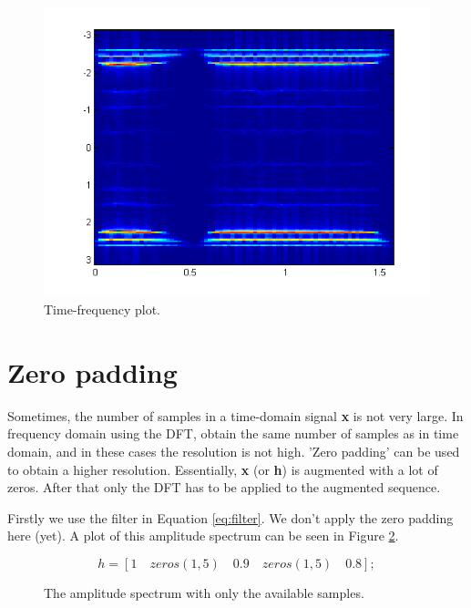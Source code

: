 \documentclass[final]{scrreprt} %
\begin{document}
\begin{figure}[h]
\centering
\includegraphics[scale = 0.5]{resources/labday1/timefrequentieplot.png}
\caption{Time-frequency plot.}
\label{fig:timefreq}
\end{figure}



\section{Zero padding}
Sometimes, the number of samples in a time-domain signal \textbf{x} is not very large. 
In frequency domain using the DFT, obtain the same number of samples as in time domain, and in these cases the resolution is not high.
'Zero padding' can be used to obtain a higher resolution.
Essentially, \textbf{x} (or \textbf{h}) is augmented with a lot of zeros.
After that only the DFT has to be applied to the augmented sequence. 

Firstly we use the filter in Equation \ref{eq:filter}. 
We don't apply the zero padding here (yet). 
A plot of this amplitude spectrum can be seen in Figure \ref{fig:zeropadding1}.

\begin{equation}
h = [1\quad zeros(1,5)\quad 0.9\quad zeros(1,5)\quad 0.8];
\label{eq:filter}
\end{equation}

\begin{figure}[H]
	\centering
	\setlength\figureheight{6cm}
  	\setlength\figurewidth{10cm}
	
	\caption{The amplitude spectrum with only the available samples.}
	\label{fig:zeropadding1}
\end{figure}
\end{document}

